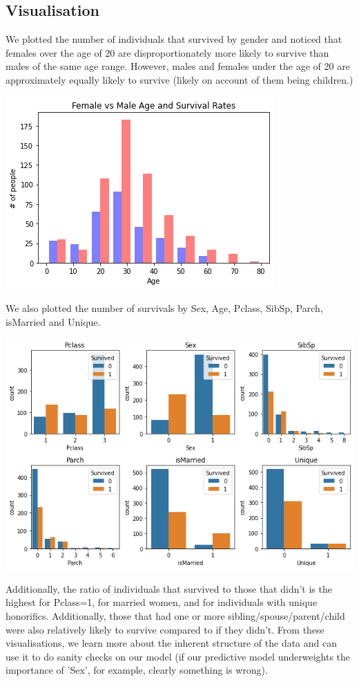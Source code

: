 \documentclass[12pt]{article}
\begin{document}
\subsection{Visualisation}

We plotted the number of individuals that survived by gender and noticed that females over the age of 20 are disproportionately more likely to survive than males of the same age range. However, males and females under the age of 20 are approximately equally likely to survive (likely on account of them being children.)\newline

\includegraphics[scale=0.6]{female_v_male_age}

We also plotted the number of survivals by Sex, Age, Pclass, SibSp, Parch, isMarried and Unique.\newline

\includegraphics[scale=0.4]{factors_v_survival}

Additionally, the ratio of individuals that survived to those that didn't is the highest for Pclass=1, for married women, and for individuals with unique honorifics. Additionally, those that had one or more sibling/spouse/parent/child were also relatively likely to survive compared to if they didn't. From these visualisations, we learn more about the inherent structure of the data and can use it to do sanity checks on our model (if our predictive model underweights the importance of 'Sex', for example, clearly something is wrong).\newline
\end{document}
